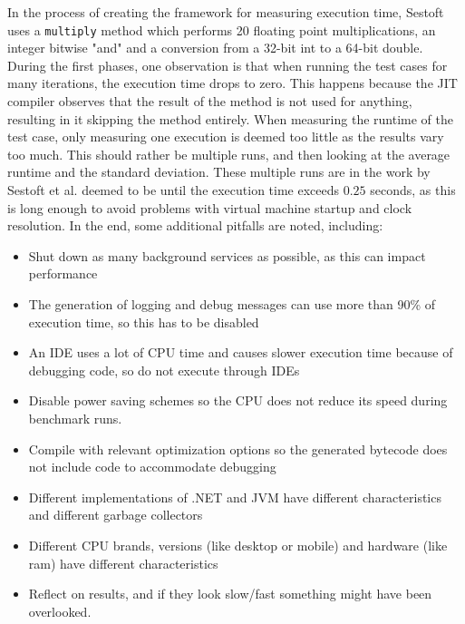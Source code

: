 In the process of creating the framework for measuring execution time, Sestoft\cite*[]{sestoft2013microbenchmarks} uses a \texttt{multiply} method which performs 20 floating point multiplications, an integer bitwise "and" and a conversion from a 32-bit int to a 64-bit double. During the first phases, one observation is that when running the test cases for many iterations, the execution time drops to zero. This happens because the JIT compiler observes that the result of the method is not used for anything, resulting in it skipping the method entirely. When measuring the runtime of the test case, only measuring one execution is deemed too little as the results vary too much. This should rather be multiple runs, and then looking at the average runtime and the standard deviation. These multiple runs are in the work by Sestoft et al.\cite*{sestoft2013microbenchmarks} deemed to be until the execution time exceeds $0.25$ seconds, as this is long enough to avoid problems with virtual machine startup and clock resolution. In the end, some additional pitfalls are noted, including:\cite*{sestoft2013microbenchmarks}

\begin{itemize}
    \item Shut down as many background services as possible, as this can impact performance
    \item The generation of logging and debug messages can use more than 90\% of execution time, so this has to be disabled
    \item An IDE uses a lot of CPU time and causes slower execution time because of debugging code, so do not execute through IDEs
    \item Disable power saving schemes so the CPU does not reduce its speed during benchmark runs.
    \item Compile with relevant optimization options so the generated bytecode does not include code to accommodate debugging
    \item Different implementations of .NET and JVM have different characteristics and different garbage collectors
    \item Different CPU brands, versions (like desktop or mobile) and hardware (like ram) have different characteristics
    \item Reflect on results, and if they look slow/fast something might have been overlooked.
\end{itemize}



